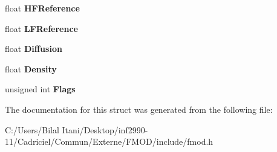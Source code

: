 \begin{DoxyCompactItemize}
\item 
float {\bfseries H\+F\+Reference}\hypertarget{struct_f_m_o_d___r_e_v_e_r_b___p_r_o_p_e_r_t_i_e_s_ac0d48e7775cc35e434535d7b0f41d425}{}\label{struct_f_m_o_d___r_e_v_e_r_b___p_r_o_p_e_r_t_i_e_s_ac0d48e7775cc35e434535d7b0f41d425}

\item 
float {\bfseries L\+F\+Reference}\hypertarget{struct_f_m_o_d___r_e_v_e_r_b___p_r_o_p_e_r_t_i_e_s_ac3edfdcc94df619aa11f5163dfacbfd4}{}\label{struct_f_m_o_d___r_e_v_e_r_b___p_r_o_p_e_r_t_i_e_s_ac3edfdcc94df619aa11f5163dfacbfd4}

\item 
float {\bfseries Diffusion}\hypertarget{struct_f_m_o_d___r_e_v_e_r_b___p_r_o_p_e_r_t_i_e_s_ae4b36833e4d30de592c954af2f0c55b3}{}\label{struct_f_m_o_d___r_e_v_e_r_b___p_r_o_p_e_r_t_i_e_s_ae4b36833e4d30de592c954af2f0c55b3}

\item 
float {\bfseries Density}\hypertarget{struct_f_m_o_d___r_e_v_e_r_b___p_r_o_p_e_r_t_i_e_s_a3672d989ace5e2dc4450b7677fa83f75}{}\label{struct_f_m_o_d___r_e_v_e_r_b___p_r_o_p_e_r_t_i_e_s_a3672d989ace5e2dc4450b7677fa83f75}

\item 
unsigned int {\bfseries Flags}\hypertarget{struct_f_m_o_d___r_e_v_e_r_b___p_r_o_p_e_r_t_i_e_s_a8e2786c436b8b3fa9bc1cbfb3f3b629c}{}\label{struct_f_m_o_d___r_e_v_e_r_b___p_r_o_p_e_r_t_i_e_s_a8e2786c436b8b3fa9bc1cbfb3f3b629c}

\end{DoxyCompactItemize}


The documentation for this struct was generated from the following file\+:\begin{DoxyCompactItemize}
\item 
C\+:/\+Users/\+Bilal Itani/\+Desktop/inf2990-\/11/\+Cadriciel/\+Commun/\+Externe/\+F\+M\+O\+D/include/fmod.\+h\end{DoxyCompactItemize}
